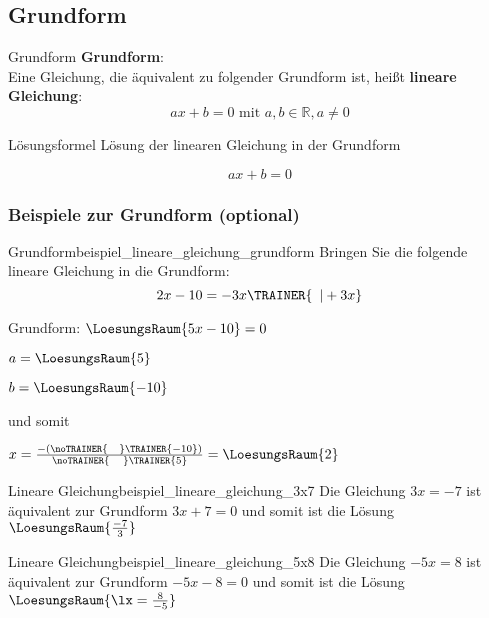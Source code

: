 
\subsection{Grundform}
\begin{definition}{Grundform}{}
  \textbf{Grundform}:\\

  Eine Gleichung, die äquivalent zu folgender Grundform ist, heißt
  \textbf{lineare Gleichung}:\\
  $$ax+b=0 \text{ mit } a,b\in\mathbb{R}, a\ne 0$$
  
  \end{definition}

\begin{gesetz}{Lösungsformel}{}
 Lösung der linearen Gleichung in der Grundform

 $$ax+b=0$$
  
\end{gesetz}

\newpage
\subsubsection{Beispiele zur Grundform (optional)}


\begin{beispiel}{Grundform}{beispiel_lineare_gleichung_grundform}
  Bringen Sie die folgende lineare Gleichung in die Grundform:
  $$2x-10 = -3x\TRAINER{\,\,\,| +3x}$$

  Grundform: $\LoesungsRaum{5x-10} = 0$

  $a = \LoesungsRaum{5}$

  $b = \LoesungsRaum{-10}$

  und somit

  \LARGE{$x=\frac{-(\noTRAINER{\,\,\,\,\,\,}\TRAINER{-10})}{\noTRAINER{\,\,\,\,\,\,\,}\TRAINER{5}}
    = \LoesungsRaum{2}$}

\end{beispiel}


\begin{beispiel}{Lineare Gleichung}{beispiel_lineare_gleichung_3x7}
  Die Gleichung $3x=-7$ ist äquivalent zur Grundform $3x+7=0$ und somit ist die Lösung $\LoesungsRaum{\frac{-7}{3}}$
  \end{beispiel}

\begin{beispiel}{Lineare Gleichung}{beispiel_lineare_gleichung_5x8}
  Die Gleichung $-5x=8$ ist äquivalent zur Grundform $-5x-8=0$ und somit ist die Lösung $\LoesungsRaum{\lx=\frac{8}{-5}}$
\end{beispiel}


\newpage
